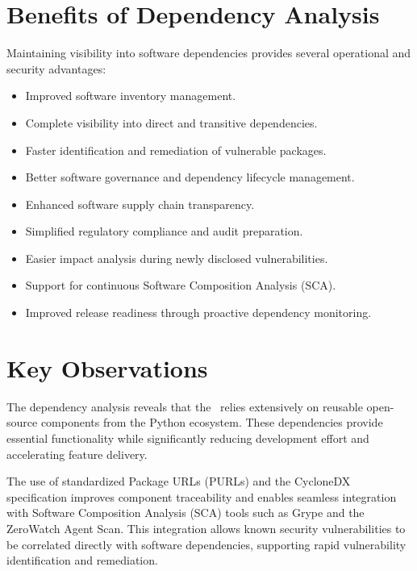 \vspace{0.4cm}


\section{Benefits of Dependency Analysis}

Maintaining visibility into software dependencies provides several operational and security advantages:
\begin{itemize}
\item Improved software inventory management.
\item Complete visibility into direct and transitive dependencies.
\item Faster identification and remediation of vulnerable packages.
\item Better software governance and dependency lifecycle management.
\item Enhanced software supply chain transparency.
\item Simplified regulatory compliance and audit preparation.
\item Easier impact analysis during newly disclosed vulnerabilities.
\item Support for continuous Software Composition Analysis (SCA).
\item Improved release readiness through proactive dependency monitoring.
\end{itemize}

\vspace{0.4cm}


\section{Key Observations}

The dependency analysis reveals that the \ProjectName\ relies extensively on reusable open-source components from the Python ecosystem. These dependencies provide essential functionality while significantly reducing development effort and accelerating feature delivery.

The use of standardized Package URLs (PURLs) and the CycloneDX specification improves component traceability and enables seamless integration with Software Composition Analysis (SCA) tools such as Grype and the ZeroWatch Agent Scan. This integration allows known security vulnerabilities to be correlated directly with software dependencies, supporting rapid vulnerability identification and remediation.

